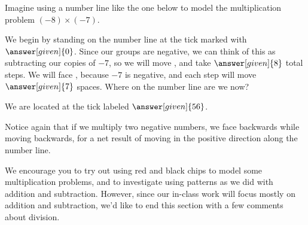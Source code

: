 \documentclass{ximera}
\begin{document}
\begin{example}
Imagine using a number line like the one below to model the multiplication problem $(-8) \times (-7)$.
\begin{center}
\end{center}
We begin by standing on the number line at the tick marked with $\answer[given]{0}$.  Since our groups are negative, we can think of this as subtracting our copies of $-7$, so we will move 
, and take $\answer[given]{8}$ total steps.  We will face , because $-7$ is negative, and each step will move  $\answer[given]{7}$ spaces.  Where on the number line are we now? 

\begin{prompt}
We are located at the tick labeled $\answer[given]{56}$.
\end{prompt}
\end{example}

Notice again that if we multiply two negative numbers, we face backwards while moving backwards, for a net result of moving in the positive direction along the number line.  %

We encourage you to try out using red and black chips to model some multiplication problems, and to investigate using patterns as we did with addition and subtraction. However, since our in-class work will focus mostly on addition and subtraction, we'd like to end this section with a few comments about division.
\end{document}
